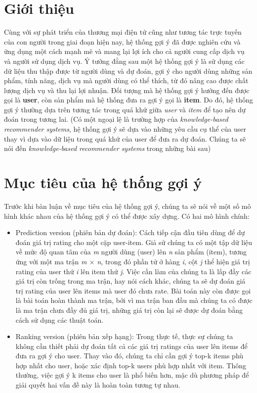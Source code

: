 \documentclass[14pt]{article}
\begin{document}
	\section{Giới thiệu}
	 	Cùng với sự phát triển của thương mại điện tử cũng như tương tác trực tuyến của con người trong giai đoạn hiện nay, hệ thống gợi ý đã được nghiên cứu và ứng dụng một cách mạnh mẽ và mang lại lợi ích cho cả người cung cấp dịch vụ và người sử dụng dịch vụ. Ý tưởng đằng sau một hệ thống gợi ý là sử dụng các dữ liệu thu thập được từ người dùng và dự đoán, gợi ý cho người dùng những sản phẩm, tính năng, dịch vụ mà người dùng có thể thích, từ đó nâng cao được chất lượng dịch vụ và thu lại lợi nhuận. Đối tượng mà hệ thống gợi ý hướng đến được gọi là \textbf{user}, còn sản phẩm mà hệ thống đưa ra gợi ý gọi là \textbf{item}. Do đó, hệ thống gợi ý thường dựa trên tương tác trong quá khứ giữa \textit{user} và \textit{item} để tạo nên dự đoán trong tương lai. (Có một ngoại lệ là trường hợp của \textit{ knowledge-based recommender systems}, hệ thống gợi ý sẽ dựa vào những yêu cầu cụ thể của user thay vì dựa vào dữ liệu trong quá khứ của user để đưa ra dự đoán. Chúng ta sẽ nói đến \textit{ knowledge-based recommender systems} trong những bài sau)
	\section{Mục tiêu của hệ thống gợi ý}
	Trước khi bàn luận về mục tiêu của hệ thống gợi ý, chúng ta sẽ nói về một số mô hình khác nhau của hệ thống gợi ý có thể được xây dựng. Có hai mô hình chính:
	\begin{itemize}
		\item Prediction version (phiên bản dự đoán): Cách tiếp cận đầu tiên dùng để dự đoán giá trị rating cho một cặp user-item. Giả sử chúng ta có một tập dữ liệu về mức độ quan tâm của \textit{m} người dùng (user) lên \textit{n} sản phẩm (item), tương ứng với một ma trận \textit{m $\times$ n}, trong đó phần tử ở hàng \textit{i}, cột \textit{j} thể hiện giá trị rating của user thứ \textit{i} lên item thứ \textit{j}. Việc cần làm của chúng ta là lấp đầy các giá trị còn trống trong ma trận, hay nói cách khác, chúng ta sẽ dự đoán giá trị rating của user lên items mà user đó chưa rate. Bài toán này còn được gọi là bài toán hoàn thành ma trận, bởi vì ma trận ban đầu mà chúng ta có được là ma trận chưa đầy đủ giá trị, những giá trị còn lại sẽ được dự đoán bằng cách sử dụng các thuật toán.
		
		\item Ranking version (phiên bản xếp hạng): Trong thực tế, thực sự chúng ta không cần thiết phải dự đoán tất cả các giá trị ratings của user lên items để đưa ra gợi ý cho user. Thay vào đó, chúng ta chỉ cần gợi ý top-k items phù hợp nhất cho user, hoặc xác định top-k users phù hợp nhất với item. Thông thường, việc gợi ý k items cho user là phổ biến hơn, mặc dù phương pháp để giải quyết hai vấn đề này là hoàn toàn tương tự nhau. 
	\end{itemize}
	
\end{document}
